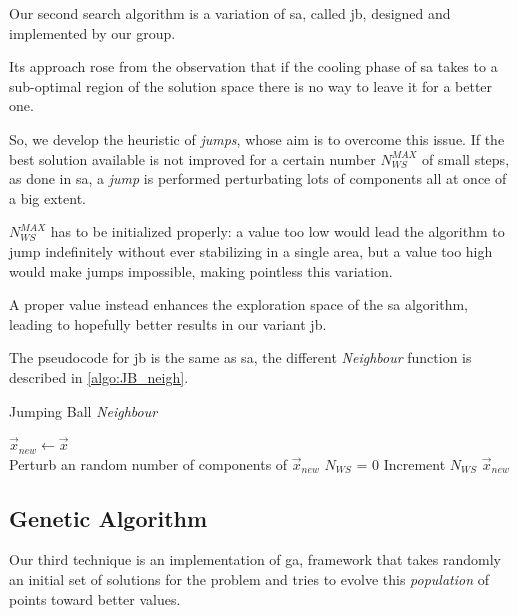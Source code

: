 \documentclass[12pt,journal,draftclsnofoot,onecolumn]{IEEEtran}
\begin{document}
Our second search algorithm is a variation of \gls{sa}, called \gls{jb}, designed and implemented by our group.

Its approach rose from the observation that if the cooling phase of \gls{sa} takes to a sub-optimal region of the solution space there is no way to leave it for a better one.

So, we develop the heuristic of \emph{jumps}, whose aim is to overcome this issue. If the best solution available is not improved for a certain number $N_{WS}^{MAX}$ of small steps, as done in \gls{sa}, a \emph{jump} is performed perturbating lots of components all at once of a big extent.

$N_{WS}^{MAX}$ has to be initialized properly: a value too low would lead the algorithm to jump indefinitely without ever stabilizing in a single area, but a value too high would make jumps impossible, making pointless this variation.

A proper value instead enhances the exploration space of the \gls{sa} algorithm, leading to hopefully better results in our variant \gls{jb}.

The pseudocode for \gls{jb} is the same as \gls{sa}, the different \emph{Neighbour} function is described in \autoref{algo:JB_neigh}.

\begin{algorithm}
	\caption{Jumping Ball \emph{Neighbour}}\label{algo:JB_neigh}
	 {
		$\vec{x}_{new} \gets \vec{x}$ \\
		 {
			 {
				Perturb an random number of components of $\vec{x}_{new}$
			}
			$N_{WS}$ = 0
		}
	}
	 {
		Increment $N_{WS}$
	}
	\Return $\vec{x}_{new}$
\end{algorithm}

\subsection{Genetic Algorithm}

Our third technique is an implementation of \gls{ga}, framework that takes randomly an initial set of solutions for the problem and tries to evolve this \emph{population} of points toward better values.
\end{document}

